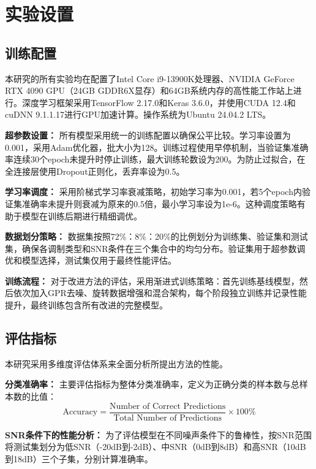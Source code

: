 \documentclass[conference]{IEEEtran}
\begin{document}
\section{实验设置}

\subsection{训练配置}

本研究的所有实验均在配置了Intel Core i9-13900K处理器、NVIDIA GeForce RTX 4090 GPU（24GB GDDR6X显存）和64GB系统内存的高性能工作站上进行。深度学习框架采用TensorFlow 2.17.0和Keras 3.6.0，并使用CUDA 12.4和cuDNN 9.1.1.17进行GPU加速计算。操作系统为Ubuntu 24.04.2 LTS。

\textbf{超参数设置：}
所有模型采用统一的训练配置以确保公平比较。学习率设置为0.001，采用Adam优化器，批大小为128。训练过程使用早停机制，当验证集准确率连续30个epoch未提升时停止训练，最大训练轮数设为200。为防止过拟合，在全连接层使用Dropout正则化，丢弃率设为0.5。

\textbf{学习率调度：}
采用阶梯式学习率衰减策略，初始学习率为0.001，若5个epoch内验证集准确率未提升则衰减为原来的0.5倍，最小学习率设为1e-6。这种调度策略有助于模型在训练后期进行精细调优。

\textbf{数据划分策略：}
数据集按照72\%：8\%：20\%的比例划分为训练集、验证集和测试集，确保各调制类型和SNR条件在三个集合中的均匀分布。验证集用于超参数调优和模型选择，测试集仅用于最终性能评估。

\textbf{训练流程：}
对于改进方法的评估，采用渐进式训练策略：首先训练基线模型，然后依次加入GPR去噪、旋转数据增强和混合架构，每个阶段独立训练并记录性能提升，最终训练包含所有改进的完整模型。

\subsection{评估指标}

本研究采用多维度评估体系来全面分析所提出方法的性能。

\textbf{分类准确率：}
主要评估指标为整体分类准确率，定义为正确分类的样本数与总样本数的比值：
\begin{equation}
\text{Accuracy} = \frac{\text{Number of Correct Predictions}}{\text{Total Number of Predictions}} \times 100\%
\end{equation}

\textbf{SNR条件下的性能分析：}
为了评估模型在不同噪声条件下的鲁棒性，按SNR范围将测试集划分为低SNR（-20dB到-2dB）、中SNR（0dB到8dB）和高SNR（10dB到18dB）三个子集，分别计算准确率。
\end{document}
